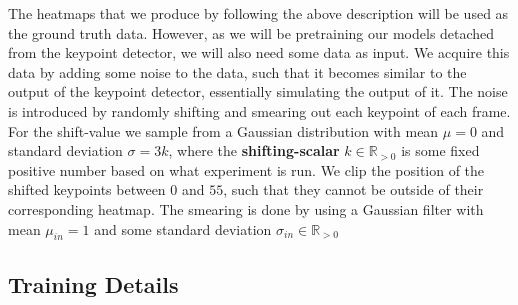 \documentclass[./main.tex]{subfiles}
\begin{document}
The heatmaps that we produce by following the above description will be used as the ground truth data. However, as we will be pretraining our models detached from the keypoint detector, we will also need some data as input. We acquire this data by adding some noise to the data, such that it becomes similar to the output of the keypoint detector, essentially simulating the output of it. The noise is introduced by randomly shifting and smearing out each keypoint of each frame. For the shift-value we sample from a Gaussian distribution with mean $\mu = 0$ and standard deviation $\sigma = 3k$, where the \textbf{shifting-scalar} $k \in \mathbb{R}_{>0}$ is some fixed positive number based on what experiment is run. We clip the position of the shifted keypoints between $0$ and $55$, such that they cannot be outside of their corresponding heatmap. The smearing is done by using a Gaussian filter with mean $\mu_{in} = 1$ and some standard deviation $\sigma_{in} \in \mathbb{R}_{>0}$

\subsection{Training Details}
\label{subsubsec:training_details}
\end{document}
